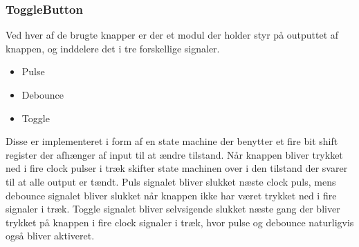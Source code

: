 \subsubsection{ToggleButton}

Ved hver af de brugte knapper er der et modul der holder styr på outputtet af knappen, og inddelere det i tre forskellige signaler.

\begin{itemize}
\item Pulse
\item Debounce
\item Toggle
\end{itemize}

Disse er implementeret i form af en state machine der benytter et fire bit shift register der afhænger af input til at ændre tilstand. Når knappen bliver trykket ned i fire clock pulser i træk skifter state machinen over i den tilstand der svarer til at alle output er tændt. Puls signalet bliver slukket næste clock puls, mens debounce signalet bliver slukket når knappen ikke har været trykket ned i fire signaler i træk. Toggle signalet bliver selvsigende slukket næste gang der bliver trykket på knappen i fire clock signaler i træk, hvor pulse og debounce naturligvis også bliver aktiveret.


